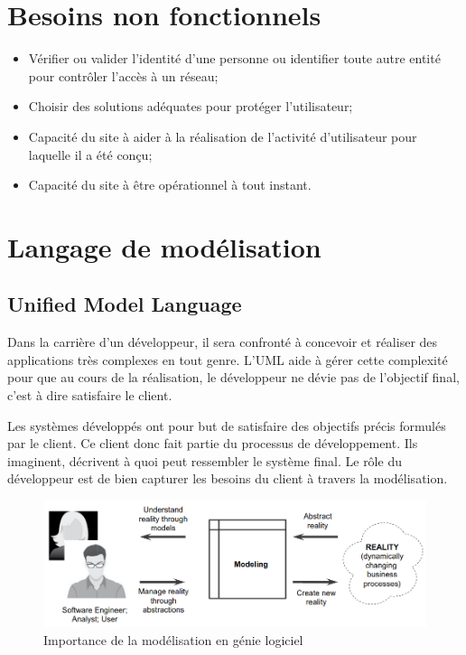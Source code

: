 \documentclass[french]{report}
\begin{document}
\section{Besoins non fonctionnels}
\begin{itemize}
	\item Vérifier ou valider l'identité d'une personne ou identifier toute autre entité pour contrôler 
	l'accès à un réseau;
	\item Choisir des solutions adéquates pour protéger l'utilisateur;
	\item Capacité du site à aider à la réalisation de l'activité d'utilisateur pour laquelle il a été conçu;
	\item Capacité du site à être opérationnel à tout instant.
\end{itemize}

\section{Langage de modélisation}
    \subsection{Unified Model Language}
    Dans la carrière d'un développeur, il sera confronté à concevoir et réaliser des applications
    très complexes en tout genre. L'UML aide à gérer cette complexité pour que au cours de la réalisation,
    le développeur ne dévie pas de l'objectif final, c'est à dire satisfaire le client. \cite{learningUML}
    
    Les systèmes développés ont pour but de satisfaire des objectifs précis formulés par le client.
    Ce client donc fait partie du processus de développement. Ils imaginent, décrivent à quoi peut
    ressembler le système final. Le rôle du développeur est de bien capturer les besoins du client à
    travers la modélisation.\cite{unhelkar2017software}
    
    \begin{figure}[H]
        \centering
        \includegraphics[width=1\textwidth]{images/modelisation.png}
        \caption{Importance de la modélisation en génie logiciel}
        \label{Importance de la modélisation}
    \end{figure}
\end{document}
